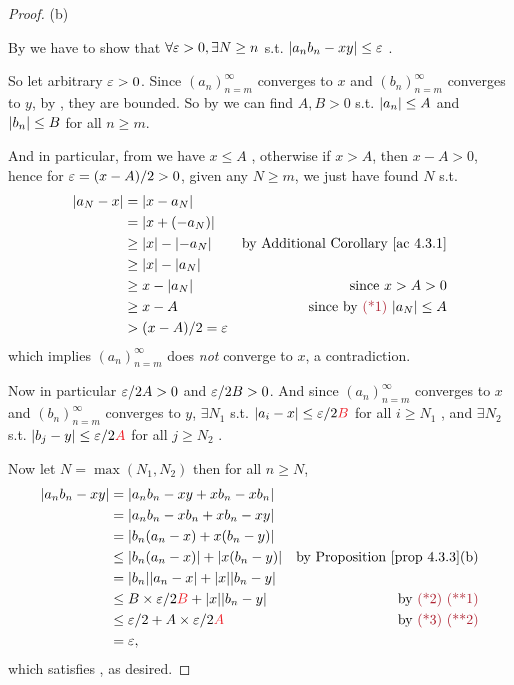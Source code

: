 \begin{proof} (b)

By  we have to show that \(\forall \varepsilon > 0, \exists N \ge n\) s.t. \(\lvert a_n b_n - xy\rvert \le \varepsilon\) .

So let arbitrary \(\varepsilon > 0\).
Since \((a_n)_{n = m}^{\infty}\) converges to \(x\) and \((b_n)_{n = m}^{\infty}\) converges to \(y\), by , they are bounded.
So by  we can find \(A, B > 0\) s.t. \(\lvert a_n\rvert \le A\)  and \(\lvert b_n\rvert \le B\)  for all \(n \ge m\).

And in particular, from  we have \(x \le A\) , otherwise if \(x > A\), then \(x - A > 0\), hence for \(\varepsilon = (x - A)/2 > 0\), given any \(N \ge m\), we just have found \(N\) s.t. 
\begin{align*}
    \abs{a_N - x} & = \abs{x - a_N} \\
                  & = \abs{x + (-a_N)} \\
                  & \ge \abs{x} - \abs{-a_N} & \text{by \AC{4.3.1}} \\
                  & \ge \abs{x} - \abs{a_N} \\
                  & \ge x - \abs{a_N} & \text{since \(x > A > 0\)} \\
                  & \ge x - A & \text{since by \MAROON{(*1)} \(\abs{a_N} \le A\)} \\
                  & > (x - A)/2 = \varE
\end{align*}
which implies \((a_n)_{n = m}^{\infty}\) does \emph{not} converge to \(x\), a contradiction.

Now in particular \(\varepsilon/2A > 0\) and \(\varepsilon/2B > 0\).
And since \((a_n)_{n = m}^{\infty}\) converges to \(x\) and \((b_n)_{n = m}^{\infty}\) converges to \(y\),
\(\exists N_1\) s.t. \(\abs{a_i - x} \le \varE/2\RED{B}\) for all \(i \ge N_1\) , and \(\exists N_2\) s.t. \(\abs{b_j - y} \le \varE/2\RED{A}\) for all \(j \ge N_2\) .

Now let \(N = \max(N_1, N_2)\) then for all \(n \ge N\),
\begin{align*}
    \abs{a_n b_n - xy} & = \abs{a_n b_n - xy + x b_n - x b_n}  \\
                       & = \abs{a_n b_n - x b_n + x b_n - xy} \\
                       & = \abs{b_n(a_n - x) + x(b_n - y)} \\
                       & \le \abs{b_n(a_n - x)} + \abs{x(b_n - y)} & \text{by \PROP{4.3.3}(b)} \\
                       & = \abs{b_n}\abs{a_n - x} + \abs{x}\abs{b_n - y} \\
                       & \le B \X \varE/2\RED{B} + \abs{x}\abs{b_n - y} & \text{by \MAROON{(*2) (**1)}} \\
                       & \le \varE/2 + A \X \varE/2\RED{A} & \text{by \MAROON{(*3) (**2)}} \\
                       & = \varE,
\end{align*}
which satisfies , as desired.
\end{proof}

